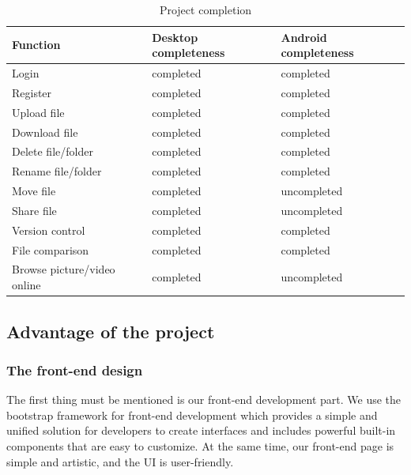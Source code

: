 \documentclass[12pt,a4]{article}
\begin{document}
\begin{table}[h]
\caption{Project completion}  
\begin{tabular}{|l|l|l|}
\hline
Function                    & Desktop completeness & Android completeness \\
\hline
Login                       & completed            & completed            \\
\hline
Register                    & completed            & completed            \\
\hline
Upload file                 & completed            &completed                      \\
\hline
Download file               & completed            &completed                      \\
\hline
Delete file/folder          & completed            &completed                      \\
\hline
Rename file/folder          & completed            &completed                      \\
\hline
Move file                   & completed            &uncompleted                      \\
\hline
Share file                  & completed            &uncompleted                      \\
\hline
Version control             & completed            &completed                      \\
\hline
File comparison             & completed            &completed                      \\
\hline
Browse picture/video online & completed            & uncompleted\\
\hline 

\end{tabular}

\end{table}

\subsection{Advantage of the project}\label{6.1}
\subsubsection{The front-end design}\label{6.1.1}
The first thing must be mentioned is our front-end development part. We use the bootstrap framework for front-end development which provides a simple and unified solution for developers to create interfaces and includes powerful built-in components that are easy to customize. At the same time, our front-end page is simple and artistic, and the UI is user-friendly.
\end{document}
